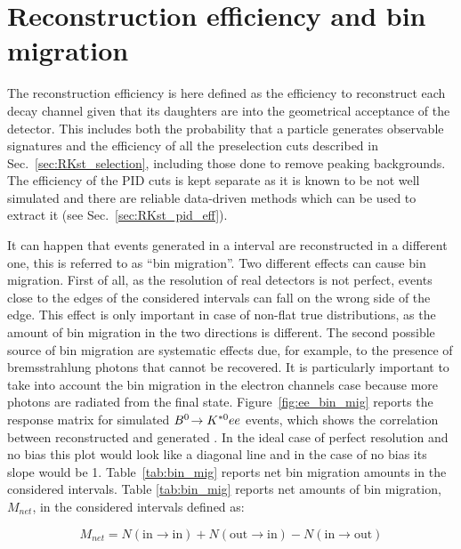 \section{Reconstruction efficiency and bin migration}

The reconstruction efficiency is here defined as the efficiency to reconstruct
each decay channel given that its daughters are into the geometrical acceptance
of the detector. This includes both the probability that a particle generates
observable signatures and the efficiency of all the preselection cuts described in Sec.~\ref{sec:RKst_selection},
including those done to remove peaking backgrounds. 
The efficiency of the PID cuts is kept separate as it is known to be not well simulated
and there are reliable data-driven methods which can be used to extract it (see Sec.~\ref{sec:RKst_pid_eff}).

It can happen that events generated in a \qsq interval are reconstructed in a different one,
this is referred to as ``bin migration''. Two different effects can cause bin migration.
First of all, as the resolution of real detectors is not perfect, events close to the edges
of the considered intervals can fall on the wrong side of the edge. This effect is only important
in case of non-flat true distributions, as the amount of bin migration in the two directions is different.
The second possible source of bin migration are systematic effects due, for example,
to the presence of bremsstrahlung photons that cannot be recovered.
It is particularly important to take into account the bin migration in the electron channels case 
because more photons are radiated from the final state.
Figure~\ref{fig:ee_bin_mig} reports the response matrix for simulated ${{B}^0}\!\rightarrow {\ensuremath{{K}^{*0}}} ee$ events,
which shows the correlation between reconstructed and generated \qsq. In the ideal case of
perfect resolution and no bias this plot would look like a diagonal line and in the case of no bias
its slope would be 1. Table~\ref{tab:bin_mig} reports net bin migration amounts in the considered \qsq intervals.
Table \ref{tab:bin_mig} reports net amounts of bin migration, $M_{net}$, in the considered \qsq intervals defined as:

\begin{equation}
M_{net} = N(\text{in} \to \text{in}) + N(\text{out} \to \text{in}) - N(\text{in} \to \text{out}) 
\end{equation}

